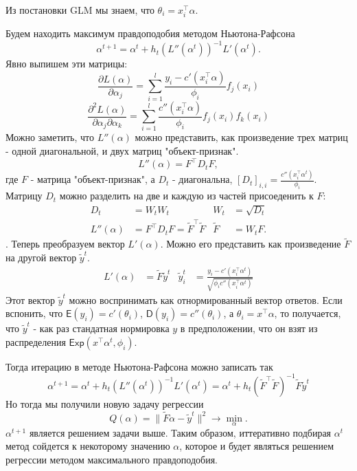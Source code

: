 Из постановки GLM мы знаем, что $\theta_i = x_i^\top\alpha$.

Будем находить максимум правдоподобия методом Ньютона-Рафсона
$$
\alpha^{t+1} = \alpha^t + h_t \left(L''(\alpha^t)\right)^{-1}L'(\alpha^t).
$$
Явно выпишем эти матрицы:
$$
\frac{\partial L(\alpha)}{\partial \alpha_j} = \sum_{i=1}^l \frac{y_i - c'(x_i^\top\alpha)}{\phi_i}f_j(x_i)
$$
$$
\frac{\partial^2 L(\alpha)}{\partial \alpha_j\partial \alpha_k} = \sum_{i=1}^l \frac{c''(x_i^\top\alpha)}{\phi_i}f_j(x_i)f_k(x_i)
$$
Можно заметить, что $L''(\alpha)$ можно представить, как произведение трех матриц - одной диагональной, и двух матриц "объект-признак".
$$
L''(\alpha) = F^\top D_t F,
$$
где $F$ - матрица "объект-признак", а $D_t$ - диагональна, $[D_t]_{i,i} = \frac{c''(x_i^\top\alpha^t)}{\phi_i}$.
Матрицу $D_t$ можно разделить на две и каждую из частей присоеденить к $F$:
\begin{align*}
  D_t &= W_t W_t & W_t &= \sqrt{D_t}\\
  L''(\alpha) &= F^\top D_t F = \widetilde{F}^\top\widetilde{F} & \widetilde{F} &= W_t F.
\end{align*}.
Теперь преобразуем вектор $L'(\alpha)$. Можно его представить как произведение $\widetilde{F}$ на другой вектор $\widetilde{y}^t$.
\begin{align*}
  L'(\alpha) &= \widetilde{F}\widetilde{y}^t & \widetilde{y}^t_i &= \frac{y_i - c'(x_i^\top\alpha^t)}{\sqrt{\phi_i c''(x_i^\top\alpha^t)}}
\end{align*}
Этот вектор $\widetilde{y}^t$ можно воспринимать как отнормированный вектор ответов. Если вспонить, что $\mathsf{E}(y_i) = c'(\theta_i)$, $\mathsf{D}(y_i) = c''(\theta_i)$, а $\theta_i = x^\top \alpha$, то получается, что $\widetilde{y}^t$ - как раз стандатная нормировка $y$ в предположении, что он взят из распределения $\mathsf{Exp}(x^\top \alpha^t, \phi_i)$.

Тогда итерацию в методе Ньютона-Рафсона можно записать так
$$
\alpha^{t+1} = \alpha^t + h_t \left(L''(\alpha^t)\right)^{-1}L'(\alpha^t) =
\alpha^t + h_t \left(\widetilde{F}^\top\widetilde{F}\right)^{-1}\widetilde{F}\widetilde{y}^t
$$
Но тогда мы получили новую задачу регрессии
$$
Q(\alpha) = \|\widetilde{F} \alpha - \widetilde{y}^t\|^2 \to \min_{\alpha}.
$$
$\alpha^{t+1}$ является решением задачи выше. Таким образом, иттеративно подбирая $\alpha^t$ метод сойдется к некоторому значению $\alpha$, которое и будет являться решением регрессии методом максимального правдоподобия.

